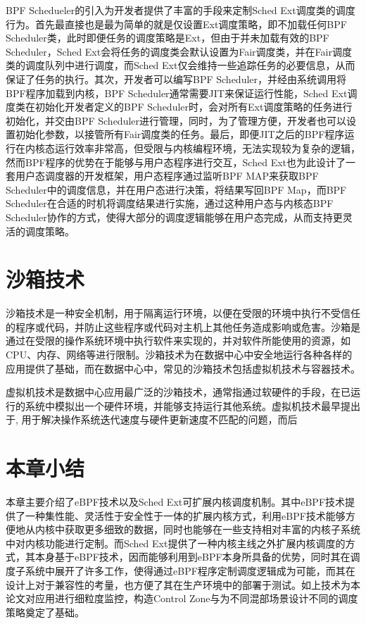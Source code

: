 BPF Schedueler的引入为开发者提供了丰富的手段来定制Sched Ext调度类的调度行为。首先最直接也是最为简单的就是仅设置Ext调度策略，即不加载任何BPF Scheduler类，此时即便任务的调度策略是Ext，但由于并未加载有效的BPF Scheduler，Sched Ext会将任务的调度类会默认设置为Fair调度类，并在Fair调度类的调度队列中进行调度，而Sched Ext仅会维持一些追踪任务的必要信息，从而保证了任务的执行。其次，开发者可以编写BPF Scheduler，并经由系统调用将BPF程序加载到内核，BPF Scheduler通常需要JIT来保证运行性能，Sched Ext调度类在初始化开发者定义的BPF Scheduler时，会对所有Ext调度策略的任务进行初始化，并交由BPF Scheduler进行管理，同时，为了管理方便，开发者也可以设置初始化参数，以接管所有Fair调度类的任务。最后，即便JIT之后的BPF程序运行在内核态运行效率非常高，但受限与内核编程环境，无法实现较为复杂的逻辑，然而BPF程序的优势在于能够与用户态程序进行交互，Sched Ext也为此设计了一套用户态调度器的开发框架，用户态程序通过监听BPF MAP来获取BPF Scheduler中的调度信息，并在用户态进行决策，将结果写回BPF Map，而BPF Scheduler在合适的时机将调度结果进行实施，通过这种用户态与内核态BPF Scheduler协作的方式，使得大部分的调度逻辑能够在用户态完成，从而支持更灵活的调度策略。

\section{沙箱技术}


沙箱技术是一种安全机制，用于隔离运行环境，以便在受限的环境中执行不受信任的程序或代码，并防止这些程序或代码对主机上其他任务造成影响或危害。沙箱是通过在受限的操作系统环境中执行软件来实现的，并对软件所能使用的资源，如CPU、内存、网络等进行限制。沙箱技术为在数据中心中安全地运行各种各样的应用提供了基础，而在数据中心中，常见的沙箱技术包括虚拟机技术与容器技术。

虚拟机技术是数据中心应用最广泛的沙箱技术，通常指通过软硬件的手段，在已运行的系统中模拟出一个硬件环境，并能够支持运行其他系统。虚拟机技术最早提出于\citep{bugnion1997disco}, 用于解决操作系统迭代速度与硬件更新速度不匹配的问题，而后

\section{本章小结}

本章主要介绍了eBPF技术以及Sched Ext可扩展内核调度机制。其中eBPF技术提供了一种集性能、灵活性于安全性于一体的扩展内核方式，利用eBPF技术能够方便地从内核中获取更多细致的数据，同时也能够在一些支持相对丰富的内核子系统中对内核功能进行定制。而Sched Ext提供了一种内核主线之外扩展内核调度的方式，其本身基于eBPF技术，因而能够利用到eBPF本身所具备的优势，同时其在调度子系统中展开了许多工作，使得通过eBPF程序定制调度逻辑成为可能，而其在设计上对于兼容性的考量，也方便了其在生产环境中的部署于测试。如上技术为本论文对应用进行细粒度监控，构造Control Zone与为不同混部场景设计不同的调度策略奠定了基础。